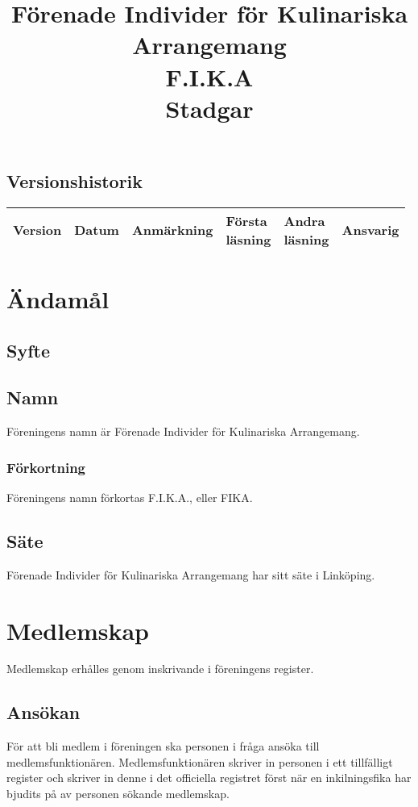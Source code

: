 \documentclass{article}
\title{Förenade Individer för Kulinariska Arrangemang \\
                F.I.K.A \\
                Stadgar}
\author{}
\date{\documentdate}
\begin{document}
\maketitle
\newpage

\subsection*{Versionshistorik}

\begin{tabularx}{\textwidth}{|l|l|X|l|l|l|}
\hline
Version & Datum & Anmärkning & \makecell{Första\\läsning} & \makecell{Andra\\läsning} & Ansvarig \\
\hline
\end{tabularx}
\newpage

\tableofcontents
\newpage
{}

\section{Ändamål}
\subsection{Syfte}
\subsection{Namn}
Föreningens namn är Förenade Individer för Kulinariska Arrangemang.
\subsubsection{Förkortning}
Föreningens namn förkortas F.I.K.A., eller FIKA.
\subsection{Säte}
Förenade Individer för Kulinariska Arrangemang har sitt säte i Linköping.


\section{Medlemskap}
Medlemskap erhålles genom inskrivande i föreningens register.
\subsection{Ansökan}
För att bli medlem i föreningen ska personen i fråga ansöka till
medlemsfunktionären. Medlemsfunktionären skriver in personen i ett tillfälligt
register och skriver in denne i det officiella registret först när en
inkilningsfika har bjudits på av personen sökande medlemskap.
\end{document}
